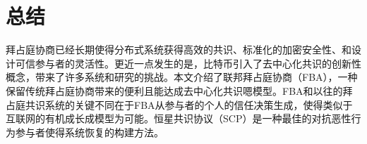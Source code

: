 \section{总结}\label{sec:summary}

拜占庭协商已经长期使得分布式系统获得高效的共识、标准化的加密安全性、和设计可信参与者的灵活性。更近一点发生的是，比特币引入了去中心化共识的创新性概念，带来了许多系统和研究的挑战。本文介绍了联邦拜占庭协商（FBA），一种保留传统拜占庭协商带来的便利且能达成去中心化共识嗯模型。FBA和以往的拜占庭共识系统的关键不同在于FBA从参与者的个人的信任决策生成{\quorum}，使得类似于互联网的有机成长成模型为可能。恒星共识协议（SCP）是一种最佳的对抗恶性行为参与者使得系统恢复的构建方法。